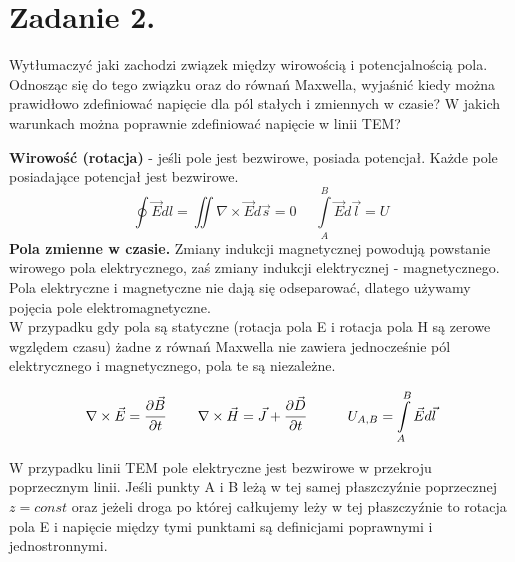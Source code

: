 \section*{Zadanie 2.}
\begin{task}
Wytłumaczyć jaki zachodzi związek między wirowością i potencjalnością pola. Odnosząc się do tego związku oraz do równań Maxwella, wyjaśnić kiedy można prawidłowo zdefiniować napięcie dla pól stałych i zmiennych w czasie? W jakich warunkach można poprawnie zdefiniować napięcie w linii TEM?\\
\end{task}

\begin{solution}

\textbf{Wirowość (rotacja)} - jeśli pole jest bezwirowe, posiada potencjał. Każde pole posiadające potencjał jest bezwirowe.
$$\oint\vec{E}dl=\iint\nabla\times\vec{E}d\vec{s}=0 \ \ \ \ \ \ \int\limits_{A}^{B}\vec{E}d\vec{l}=U$$
\textbf{Pola zmienne w czasie.} Zmiany indukcji magnetycznej powodują powstanie wirowego pola elektrycznego, zaś zmiany indukcji elektrycznej - magnetycznego.\\Pola elektryczne i magnetyczne nie dają się odseparować, dlatego używamy pojęcia pole elektromagnetyczne.\\W przypadku gdy pola są statyczne (rotacja pola E i rotacja pola H są zerowe wgzlędem czasu) żadne z równań Maxwella nie zawiera jednocześnie pól elektrycznego i magnetycznego, pola te są niezależne.

$$\nabla\times\vec{E}=\cfrac{\partial\vec{B}}{\partial t}\ \ \ \ \ \ \ \nabla\times\vec{H}=\vec{J}+\cfrac{\partial\vec{D}}{\partial t}\ \ \ \ \ \ \ \ \ U_{A,B}=\int\limits_{A}^{B}\vec{E}d\vec{l}$$

W przypadku linii TEM pole elektryczne jest bezwirowe w przekroju poprzecznym linii. Jeśli punkty A i B leżą w tej samej płaszczyźnie poprzecznej $z=const$ oraz jeżeli droga po której całkujemy leży w tej płaszczyźnie to rotacja pola E i napięcie między tymi punktami są definicjami poprawnymi i jednostronnymi.
\end{solution}